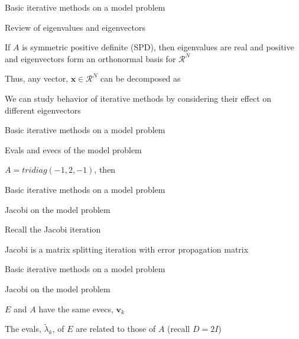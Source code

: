 \documentclass[18pt,xcolor=table]{beamer}
\begin{document}
\begin{frame}{Basic iterative methods on a model problem}
\begin{block}{Review of eigenvalues and eigenvectors}
\bit
\item If $A$ is symmetric positive definite (SPD), then eigenvalues are real and positive and eigenvectors form an orthonormal basis for $\mathcal{R}^N$
\item Thus, any vector, $\mathbf{x}\in\mathcal{R}^N$ can be decomposed as 
\item We can study behavior of iterative methods by considering their effect on different eigenvectors
\eit
\end{block}
\end{frame}

\begin{frame}{Basic iterative methods on a model problem}
\begin{block}{Evals and evecs of the model problem}
\bit
\item $A = tridiag(-1,2,-1)$, then
\eit
\end{block}
\end{frame}

\begin{frame}{Basic iterative methods on a model problem}
\begin{block}{Jacobi on the model problem}
\bit
\item Recall the Jacobi iteration
\item Jacobi is a matrix splitting iteration with error propagation matrix
\eit
\end{block}
\end{frame}

\begin{frame}{Basic iterative methods on a model problem}
\begin{block}{Jacobi on the model problem}
\bit
\item $E$ and $A$ have the same evecs, $\mathbf{v}_k$
\item The evals, $\tilde\lambda_k$, of $E$ are related to those of $A$ (recall $D = 2I$)
\eit
\end{block}
\end{frame}
\end{document}
